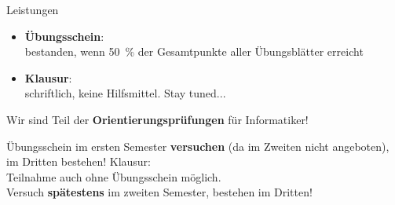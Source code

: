 

\begin{frame}[t]{Leistungen}
	\begin{itemize}
		\item \textbf{Übungsschein}: \\
			  bestanden, wenn 50~\% der Gesamtpunkte aller Übungsblätter erreicht \\
		\item \textbf{Klausur}: \Klausurtermin \\
			  schriftlich, keine Hilfsmittel. \quad Stay tuned... 
	\end{itemize}
	\pause
	Wir sind Teil der \textbf{Orientierungsprüfungen} für Informatiker!
	\begin{itemize}
		\implitem Übungsschein im ersten Semester \textbf{versuchen} (da im Zweiten nicht angeboten), im Dritten bestehen! 
		\implitem Klausur: \\
		Teilnahme auch ohne Übungsschein möglich. \\
		Versuch \textbf{spätestens} im zweiten Semester, bestehen im Dritten!
	\end{itemize}
	\pause
\end{frame}

